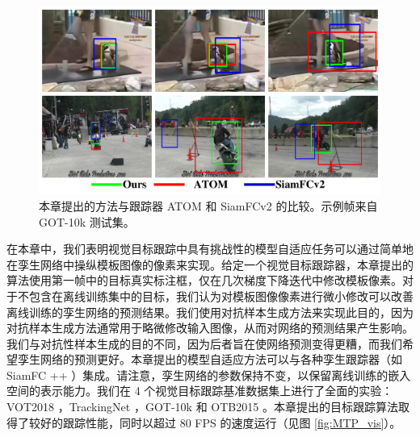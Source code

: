 \begin{figure}[t]
    \centering
    \includegraphics[width=1.0\textwidth]{Img/MTP/got10k/visulization2.pdf}
    \caption{本章提出的方法与跟踪器 ATOM \cite{danelljan2019atom} 和 SiamFCv2 \cite{SiamFC} 的比较。示例帧来自 GOT-10k \cite{GOT-10k} 测试集。}
    \label{fig:MTP_vis1}
\end{figure}

在本章中，我们表明视觉目标跟踪中具有挑战性的模型自适应任务可以通过简单地在孪生网络中操纵模板图像的像素来实现。给定一个视觉目标跟踪器，本章提出的算法使用第一帧中的目标真实标注框，仅在几次梯度下降迭代中修改模板像素。对于不包含在离线训练集中的目标，我们认为对模板图像像素进行微小修改可以改善离线训练的孪生网络的预测结果。我们使用对抗样本生成方法来实现此目的，因为对抗样本生成方法通常用于略微修改输入图像，从而对网络的预测结果产生影响。我们与对抗性样本生成的目的不同，因为后者旨在使网络预测变得更糟，而我们希望孪生网络的预测更好。本章提出的模型自适应方法可以与各种孪生跟踪器（如 SiamFC ++ \cite{SiamFC++}）集成。请注意，孪生网络的参数保持不变，以保留离线训练的嵌入空间的表示能力。我们在 4 个视觉目标跟踪基准数据集上进行了全面的实验：VOT2018 \cite{kristan2018sixth}，TrackingNet \cite{muller2018trackingnet}，GOT-10k \cite{GOT-10k} 和 OTB2015 \cite{OTB}。本章提出的目标跟踪算法取得了较好的跟踪性能，同时以超过 80 FPS 的速度运行（见图 \ref{fig:MTP_vis}）。
